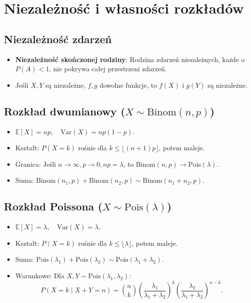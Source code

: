 \documentclass{article}
\theoremstyle{definition}
\theoremstyle{remark}
\begin{document}
\begin{multicols}{2}
\begin{itemize}[itemsep=0pt, left=0pt]
    \end{itemize}
    \section*{Niezależność i własności rozkładów}

    \subsection*{Niezależność zdarzeń}
    \begin{itemize}[itemsep=0pt, left=0pt]
        \item \textbf{Niezależność skończonej rodziny}: Rodzina zdarzeń niezależnych, każde o \( P(A) < 1 \), nie pokrywa całej przestrzeni zdarzeń.
        \item Jeśli \( X, Y \) są niezależne, \( f, g \) dowolne funkcje, to \( f(X) \) i \( g(Y) \) są niezależne.
    \end{itemize}
    
    \subsection*{Rozkład dwumianowy (\( X \sim \text{Binom}(n, p) \))}
    \begin{itemize}[itemsep=0pt, left=0pt]
        \item \(\mathbb{E}[X] = n p, \quad \text{Var}(X) = n p (1-p)\).
        \item Kształt: \( P(X=k) \) rośnie dla \( k \leq \lfloor (n+1)p \rfloor \), potem maleje.
        \item Granica: Jeśli \( n \to \infty, p \to 0, np = \lambda \), to \( \text{Binom}(n, p) \to \text{Pois}(\lambda) \).
        \item Suma: \( \text{Binom}(n_1, p) + \text{Binom}(n_2, p) \sim \text{Binom}(n_1+n_2, p) \).
    \end{itemize}
    
    \subsection*{Rozkład Poissona (\( X \sim \text{Pois}(\lambda) \))}
    \begin{itemize}[itemsep=0pt, left=0pt]
        \item \(\mathbb{E}[X] = \lambda, \quad \text{Var}(X) = \lambda\).
        \item Kształt: \( P(X=k) \) rośnie dla \( k \leq \lfloor \lambda \rfloor \), potem maleje.
        \item Suma: \( \text{Pois}(\lambda_1) + \text{Pois}(\lambda_2) \sim \text{Pois}(\lambda_1+\lambda_2) \).
        \item Warunkowe: Dla \( X, Y \sim \text{Pois}(\lambda_1, \lambda_2) \):
        \[
        P(X=k \mid X+Y=n) = \binom{n}{k} \left(\frac{\lambda_1}{\lambda_1+\lambda_2}\right)^k \left(\frac{\lambda_2}{\lambda_1+\lambda_2}\right)^{n-k}.
        \]
    \end{itemize}
    

\end{multicols}
\end{document}
